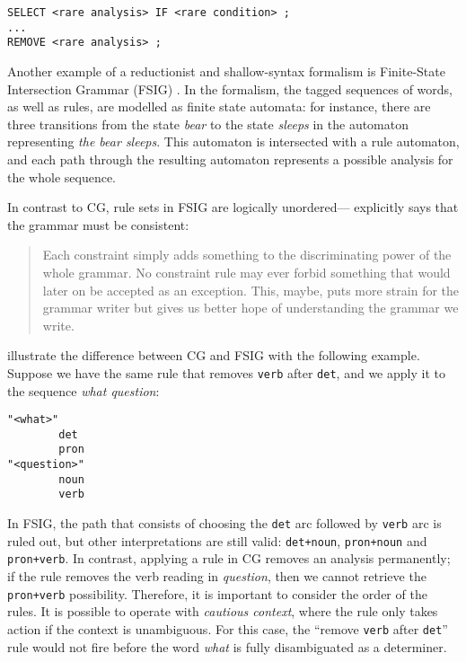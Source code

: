 \begin{verbatim}
SELECT <rare analysis> IF <rare condition> ;
...
REMOVE <rare analysis> ;
\end{verbatim}

Another example of a reductionist and shallow-syntax formalism is
Finite-State Intersection Grammar (FSIG) \citep{koskenniemi90}. In the
formalism, the tagged sequences of words, as well as rules, are modelled
as finite state automata: for instance, there are three transitions from
the state \emph{bear} to the state \emph{sleeps} in the automaton
representing \emph{the bear sleeps}. This automaton is intersected with
a rule automaton, and each path through the resulting automaton
represents a possible analysis for the whole sequence.

In contrast to CG, rule sets in FSIG are logically
unordered---\cite{koskenniemi90} explicitly says that the grammar must be
consistent:

\begin{quote}
Each constraint simply adds something to the discriminating power of the
whole grammar. No constraint rule may ever forbid something that would
later on be accepted as an exception. This, maybe, puts more strain for
the grammar writer but gives us better hope of understanding the grammar
we write.
\end{quote}

\cite{lager_nivre01} illustrate the difference between CG and FSIG with
the following example. Suppose we have the same rule that removes \texttt{verb}
after \texttt{det}, and we apply it to the sequence \emph{what
question}:


\begin{verbatim}
"<what>"
        det
        pron
"<question>"
        noun
        verb
\end{verbatim}


In FSIG, the path that consists of choosing the \texttt{det} arc
followed by \texttt{verb} arc is ruled out, but other interpretations
are still valid: \texttt{det+noun}, \texttt{pron+noun} and
\texttt{pron+verb}. In contrast, applying a rule in CG removes an
analysis permanently; if the rule removes the verb reading in
\emph{question}, then we cannot retrieve the \texttt{pron+verb}
possibility. Therefore, it is important to consider the order of the
rules. It is possible to operate with \emph{cautious context}, where the
rule only takes action if the context is unambiguous. For this case, the
``remove \texttt{verb} after \texttt{det}'' rule would not fire before
the word \emph{what} is fully disambiguated as a determiner.


